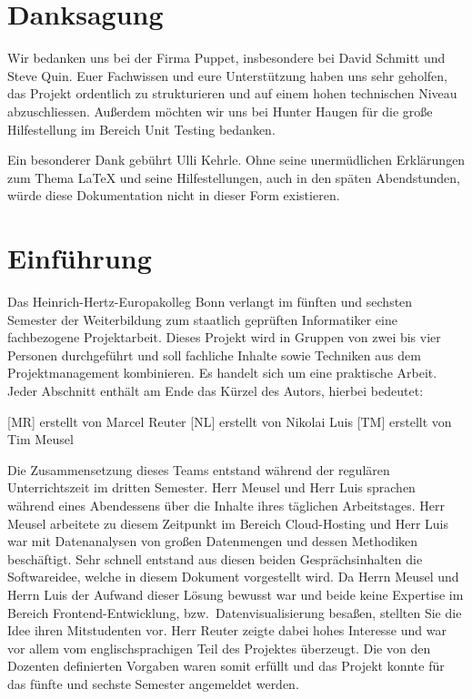 \chapter*{Danksagung}
Wir bedanken uns bei der Firma Puppet, insbesondere bei David Schmitt und Steve
Quin. Euer Fachwissen und eure Unterstützung haben uns sehr geholfen, das
Projekt ordentlich zu strukturieren und auf einem hohen technischen Niveau
abzuschliessen. Außerdem möchten wir uns bei Hunter Haugen für die
große Hilfestellung im Bereich Unit Testing bedanken.

Ein besonderer Dank gebührt Ulli Kehrle. Ohne seine unermüdlichen Erklärungen
zum Thema \LaTeX{} und seine Hilfestellungen, auch in den späten Abendstunden,
würde diese Dokumentation nicht in dieser Form existieren.

\newpage

\tableofcontents
\listoffigures
\begingroup
\let\clearpage\relax
\lstlistoflistings{}
\listoftables
\endgroup

\chapter{Einführung}
\label{chap:einfuehrung}
Das Heinrich\hyp{}Hertz\hyp{}Europakolleg Bonn verlangt im fünften und sechsten
Semester der Weiterbildung zum staatlich geprüften Informatiker eine
fachbezogene Projektarbeit. Dieses Projekt wird in Gruppen von zwei bis vier
Personen durchgeführt und soll fachliche Inhalte sowie Techniken aus dem
Projektmanagement kombinieren. Es handelt sich um eine praktische Arbeit. Jeder
Abschnitt enthält am Ende das Kürzel des Autors, hierbei bedeutet:

\begin{outline}
  \1 {[MR]} erstellt von Marcel Reuter
  \1 {[NL]} erstellt von Nikolai Luis
  \1 {[TM]} erstellt von Tim Meusel
\end{outline}

Die Zusammensetzung dieses Teams entstand während der regulären Unterrichtszeit
im dritten Semester. Herr Meusel und Herr Luis sprachen während eines
Abendessens über die Inhalte ihres täglichen Arbeitstages. Herr Meusel
arbeitete zu diesem Zeitpunkt im Bereich \gls{Cloud}\hyp{}Hosting und Herr Luis
war mit Datenanalysen von großen Datenmengen und dessen Methodiken beschäftigt.
Sehr schnell entstand aus diesen beiden Gesprächsinhalten die Softwareidee,
welche in diesem Dokument vorgestellt wird. Da Herrn Meusel und Herrn Luis der
Aufwand dieser Lösung bewusst war und beide keine Expertise im Bereich
Frontend\hyp{}Entwicklung, bzw.\ Datenvisualisierung besaßen, stellten Sie die
Idee ihren Mitstudenten vor. Herr Reuter zeigte dabei hohes Interesse und war
vor allem vom englischsprachigen Teil des Projektes überzeugt. Die von den
Dozenten definierten Vorgaben waren somit erfüllt und das Projekt konnte für
das fünfte und sechste Semester angemeldet werden.

